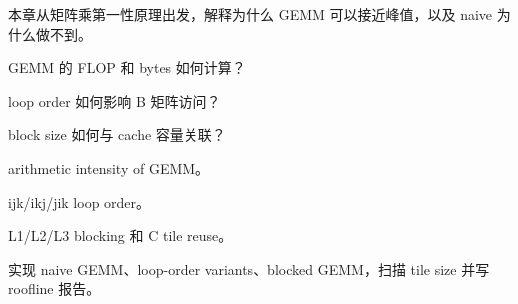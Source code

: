 {本章从矩阵乘第一性原理出发，解释为什么 GEMM 可以接近峰值，以及 naive 为什么做不到。}
{\item GEMM 的 FLOP 和 bytes 如何计算？
\item loop order 如何影响 B 矩阵访问？
\item block size 如何与 cache 容量关联？}
{\item arithmetic intensity of GEMM。
\item ijk/ikj/jik loop order。
\item L1/L2/L3 blocking 和 C tile reuse。}
{实现 naive GEMM、loop-order variants、blocked GEMM，扫描 tile size 并写 roofline 报告。}
